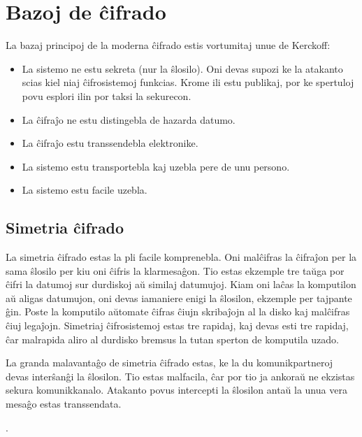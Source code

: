 \documentclass[utf8]{scrartcl}
\makeatletter
\renewenvironment{figure}[1][]{%
  \ifthenelse{\equal{#1}{}}{%
    \@float{figure}%
  }{%
    \@float{figure}[#1]%
  }%
  \centering%
}{%
\end@float\ignorespaces\ignorespacesafterend%
}
\makeatother
\begin{document}
\section{Bazoj de ĉifrado}

La bazaj principoj de la moderna ĉifrado estis vortumitaj unue de Kerckoff:
%
\begin{itemize}
\item La sistemo ne estu sekreta (nur la ŝlosilo). Oni devas supozi ke la
  atakanto scias kiel niaj ĉifrosistemoj funkcias. Krome ili estu publikaj, por
  ke spertuloj povu esplori ilin por taksi la sekurecon.
\item La ĉifraĵo ne estu distingebla de hazarda datumo.
\item La ĉifraĵo estu transsendebla elektronike.
\item La sistemo estu transportebla kaj uzebla pere de unu persono.
\item La sistemo estu facile uzebla.
\end{itemize}


\subsection{Simetria ĉifrado}

La simetria ĉifrado estas la pli facile komprenebla. Oni malĉifras la ĉifraĵon
per la sama ŝlosilo per kiu oni ĉifris la klarmesaĝon.  Tio estas ekzemple tre
taŭga por ĉifri la datumoj sur durdiskoj aŭ similaj datumujoj.  Kiam oni laĉas
la komputilon aŭ aligas datumujon, oni devas iamaniere enigi la ŝlosilon,
ekzemple per tajpante ĝin. Poste la komputilo aŭtomate ĉifras ĉiujn skribaĵojn
al la disko kaj malĉifras ĉiuj legaĵojn.  Simetriaj ĉifrosistemoj estas tre
rapidaj, kaj devas esti tre rapidaj, ĉar malrapida aliro al durdisko bremsus la
tutan sperton de komputila uzado.

La granda malavantaĝo de simetria ĉifrado estas, ke la du komunikpartneroj
devas interŝanĝi la ŝlosilon. Tio estas malfacila, ĉar por tio ja ankoraŭ ne
ekzistas sekura komunikkanalo. Atakanto povus intercepti la ŝlosilon antaŭ la
unua vera mesaĝo estas transsendata.

\begin{figure}
  \caption{La principo de simetria ĉifrado. Ambaŭ, ĉifro kaj malĉifro estas
    farata per la sama ŝlosilo $S$}.
\end{figure}
\end{document}
